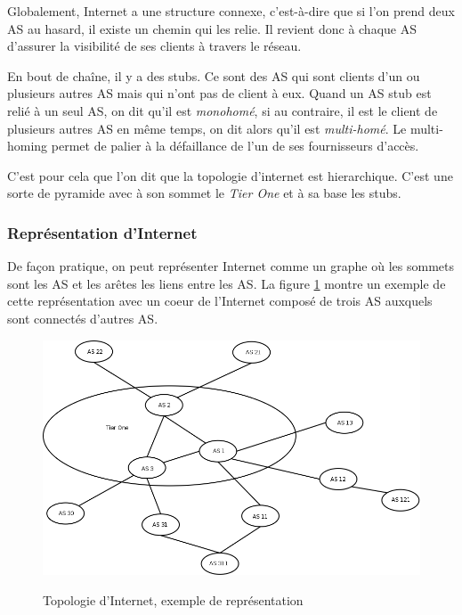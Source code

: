 \par
Globalement, Internet a une structure connexe, c'est-\`a-dire que si l'on prend deux AS au hasard, il existe un chemin qui les relie. Il revient donc \`a chaque AS d'assurer la visibilit\'e de ses clients \`a travers le r\'eseau.
\par
En bout de cha\^ine, il y a des stubs. Ce sont des AS qui sont clients d'un ou plusieurs autres AS mais qui n'ont pas de client \`a eux. Quand un AS stub est reli\'e \`a un seul AS, on dit qu'il est \textit{monohom\'e}, si au contraire, il est le client de plusieurs autres AS en m\^eme temps, on dit alors qu'il est \textit{multi-hom\'e}. Le multi-homing permet de palier à la défaillance de l'un de ses fournisseurs d'accès.
\par
C'est pour cela que l'on dit que la topologie d'internet est hierarchique. C'est une sorte de pyramide avec à son sommet le \textit{Tier One} et à sa base les stubs.

\subsubsection{Repr\'esentation d'Internet}
\par
De fa\c con pratique, on peut repr\'esenter Internet comme un graphe o\`u les sommets sont les AS et les ar\^etes les liens entre les AS. La figure \ref{topologie} montre un exemple de cette repr\'esentation avec un coeur de l'Internet compos\'e de trois AS auxquels sont connect\'es d'autres AS. 

\begin{figure}[ht]
\centering
 \fbox
 {
 \includegraphics[width=16cm]{./schema/topologie_internet.png}
 }
  \caption{\label{topologie}Topologie d'Internet, exemple de repr\'esentation}
\end{figure}



%

